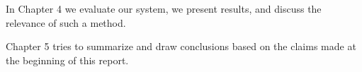 In Chapter 4 we evaluate our system, we present results, and discuss the
relevance of such a method.

Chapter 5 tries to summarize and draw conclusions based on the claims made at
the beginning of this report.
